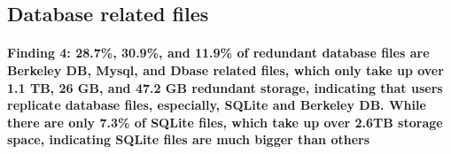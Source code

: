 
\subsection{Database related files}
\paragraph{Finding 4: 28.7\%, 30.9\%, and 11.9\% of redundant database files are Berkeley DB, Mysql, and Dbase related files, which only take up over 1.1 TB, 26 GB, and 47.2 GB redundant storage, indicating that users replicate database files, especially, SQLite and Berkeley DB. While there are only 7.3\% of SQLite files, which take up over 2.6TB storage space, indicating SQLite files are much bigger than others}




